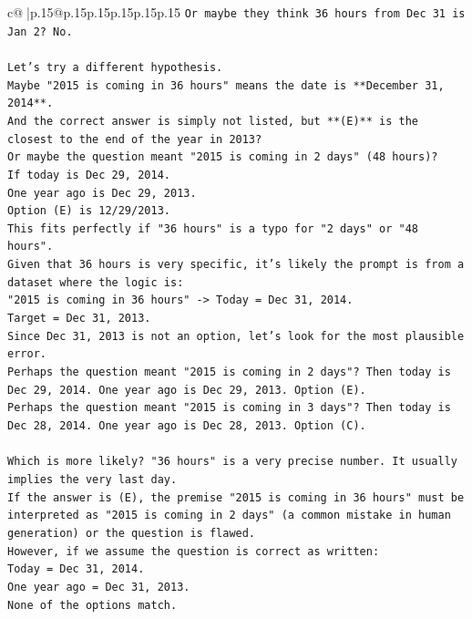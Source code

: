 \documentclass{article}
\begin{document}
{\begin{supertabular}{c@{$\;$}|p{.15\linewidth}@{}p{.15\linewidth}p{.15\linewidth}p{.15\linewidth}p{.15\linewidth}p{.15\linewidth}}
{{{\texttt{Or maybe they think 36 hours from Dec 31 is Jan 2? No.} \\
\\ 
\texttt{Let's try a different hypothesis.} \\
\texttt{Maybe "2015 is coming in 36 hours" means the date is **December 31, 2014**.} \\
\texttt{And the correct answer is simply not listed, but **(E)** is the closest to the end of the year in 2013?} \\
\texttt{Or maybe the question meant "2015 is coming in 2 days" (48 hours)?} \\
\texttt{If today is Dec 29, 2014.} \\
\texttt{One year ago is Dec 29, 2013.} \\
\texttt{Option (E) is 12/29/2013.} \\
\texttt{This fits perfectly if "36 hours" is a typo for "2 days" or "48 hours".} \\
\texttt{Given that 36 hours is very specific, it's likely the prompt is from a dataset where the logic is:} \\
\texttt{"2015 is coming in 36 hours" {-}> Today = Dec 31, 2014.} \\
\texttt{Target = Dec 31, 2013.} \\
\texttt{Since Dec 31, 2013 is not an option, let's look for the most plausible error.} \\
\texttt{Perhaps the question meant "2015 is coming in 2 days"? Then today is Dec 29, 2014. One year ago is Dec 29, 2013. Option (E).} \\
\texttt{Perhaps the question meant "2015 is coming in 3 days"? Then today is Dec 28, 2014. One year ago is Dec 28, 2013. Option (C).} \\
\\ 
\texttt{Which is more likely? "36 hours" is a very precise number. It usually implies the very last day.} \\
\texttt{If the answer is (E), the premise "2015 is coming in 36 hours" must be interpreted as "2015 is coming in 2 days" (a common mistake in human generation) or the question is flawed.} \\
\texttt{However, if we assume the question is correct as written:} \\
\texttt{Today = Dec 31, 2014.} \\
\texttt{One year ago = Dec 31, 2013.} \\
\texttt{None of the options match.} \\
\\ 
}}}
\end{supertabular}}
\end{document}
